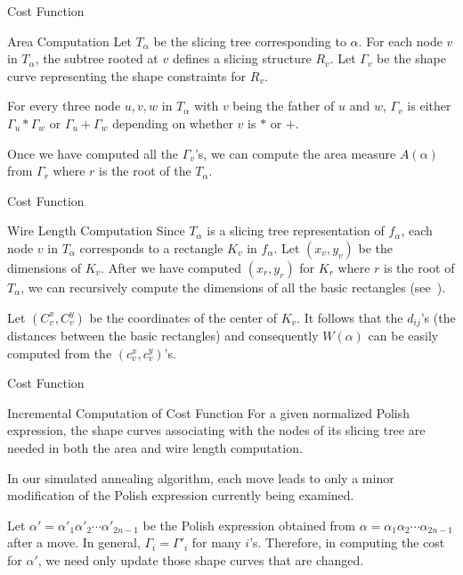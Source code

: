 \documentclass[xcolor=pdftex,dvipsnames,table]{beamer}
\begin{document}
\begin{frame}{Cost Function}
  \begin{block}{Area Computation}
    Let $T_\alpha$ be the slicing tree corresponding to $\alpha$. For each node $v$ in $T_\alpha$, the subtree rooted at $v$ defines a slicing structure $R_v$. Let $\Gamma_v$ be the shape curve representing the shape constraints for $R_v$.
    \newline

    \pause
    For every three node $u,v, w$ in $T_\alpha$ with $v$ being the father of $u$ and $w$, $\Gamma_v$ is either $\Gamma_u * \Gamma_w$ or $\Gamma_u + \Gamma_w$ depending on whether $v$ is $*$ or $+$.
    \newline

    \pause
    Once we have computed all the $\Gamma_v$'s, we can compute the area measure $A(\alpha)$ from $\Gamma_r$ where $r$ is the root of the $T_\alpha$.
  \end{block}
\end{frame}

\begin{frame}{Cost Function}
  \begin{block}{Wire Length Computation}
    Since $T_\alpha$ is a slicing tree representation of $f_\alpha$, each node $v$ in $T_\alpha$ corresponds to a rectangle $K_v$ in $f_\alpha$. Let $(x_v, y_v)$ be the dimensions of $K_v$. After we have computed $(x_r, y_r)$ for $K_r$ where $r$ is the root of $T_\alpha$, we can recursively compute the dimensions of all the basic rectangles \mbox{(see \cite{Wong1989})}.
    \newline
    \pause

    Let $(C_v^x, C_v^y)$ be the coordinates of the center of $K_v$. It follows that the $d_{ij}$'s (the distances between the basic rectangles) and consequently $W(\alpha)$ can be easily computed from the $(c_v^x, c_v^y)$'s.
  \end{block}
\end{frame}

\begin{frame}{Cost Function}
  \begin{block}{Incremental Computation of Cost Function}
    For a given normalized Polish expression, the shape curves associating with the nodes of its slicing tree are needed in both the area and wire length computation.
    \newline

    \pause
    In our simulated annealing algorithm, each move leads to only a minor modification of the Polish expression currently being examined.
    \newline

    \pause
    Let $\alpha' = \alpha'_1 \alpha'_2 \cdots \alpha'_{2n-1}$ be the Polish expression obtained from $\alpha = \alpha_1 \alpha_2 \cdots \alpha_{2n-1}$ after a move. In general, $\Gamma_i = \Gamma'_i$ for many $i$'s. Therefore, in computing the cost for $\alpha'$, we need only update those shape curves that are changed.
  \end{block}
\end{frame}
\end{document}
